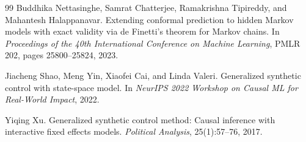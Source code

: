 \documentclass[11pt]{article}
\begin{document}
\begin{thebibliography}{99}
Buddhika Nettasinghe, Samrat Chatterjee, Ramakrishna Tipireddy, and Mahantesh Halappanavar.
\newblock Extending conformal prediction to hidden Markov models with exact validity via de Finetti's theorem for Markov chains.
\newblock In \emph{Proceedings of the 40th International Conference on Machine Learning}, PMLR 202, pages 25800--25824, 2023.

Jiacheng Shao, Meng Yin, Xiaofei Cai, and Linda Valeri.
\newblock Generalized synthetic control with state-space model.
\newblock In \emph{NeurIPS 2022 Workshop on Causal ML for Real-World Impact}, 2022.

Yiqing Xu.
\newblock Generalized synthetic control method: Causal inference with interactive fixed effects models.
\newblock \emph{Political Analysis}, 25(1):57--76, 2017.

\end{thebibliography}
\end{document}
